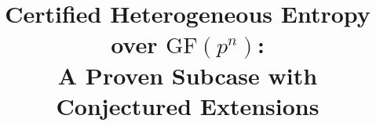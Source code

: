 %
%

\title{Certified Heterogeneous Entropy over $\mathrm{GF}(p^n)$:\\
  A Proven Subcase with Conjectured Extensions}

